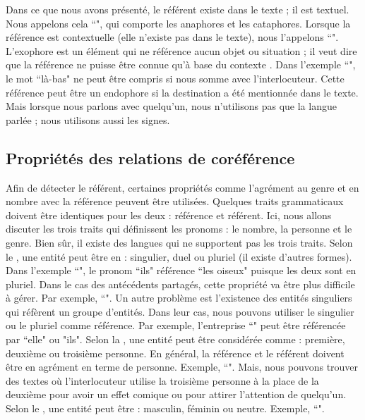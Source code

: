 \documentclass{KodeBook}
\begin{document}
Dans ce que nous avons présenté, le référent existe dans le texte ; il est textuel. 
Nous appelons cela ``", qui comporte les anaphores et les cataphores. 
Lorsque la référence est contextuelle (elle n'existe pas dans le texte), nous l'appelons ``".
L'exophore est un élément qui ne référence aucun objet ou situation ; il veut dire que la référence ne puisse être connue qu'à base du contexte \cite{2014-halliday-hasan}. 
Dans l'exemple ``", le mot ``là-bas" ne peut être compris si nous somme avec l'interlocuteur. 
Cette référence peut être un endophore si la destination a été mentionnée dans le texte. 
Mais lorsque nous parlons avec quelqu'un, nous n'utilisons pas que la langue parlée ; nous utilisons aussi les signes.

\subsection{Propriétés des relations de coréférence}

Afin de détecter le référent, certaines propriétés comme l'agrément au genre et en nombre avec la référence peuvent être utilisées. 
Quelques traits grammaticaux doivent être identiques pour les deux : référence et référent. 
Ici, nous allons discuter les trois traits qui définissent les pronoms : le nombre, la personne et le genre.
Bien sûr, il existe des langues qui ne supportent pas les trois traits. 
Selon le , une entité peut être en : singulier, duel ou pluriel (il existe d'autres formes). 
Dans l'exemple ``", le pronom ``ils" référence ``les oiseux" puisque les deux sont en pluriel. 
Dans le cas des antécédents partagés, cette propriété va être plus difficile à gérer.
Par exemple, ``".
Un autre problème est l'existence des entités singuliers qui réfèrent un groupe d'entités.
Dans leur cas, nous pouvons utiliser le singulier ou le pluriel comme référence. 
Par exemple, l'entreprise ``" peut être référencée par ``elle" ou "ils".
%
Selon la , une entité peut être considérée comme : première, deuxième ou troisième personne. 
En général, la référence et le référent doivent être en agrément en terme de personne.
Exemple,  ``".
Mais, nous pouvons trouver des textes où l'interlocuteur utilise la troisième personne à la place de la deuxième pour avoir un effet comique ou pour attirer l'attention de quelqu'un.
%
Selon le , une entité peut être : masculin, féminin ou neutre. 
Exemple, ``".
\end{document}
